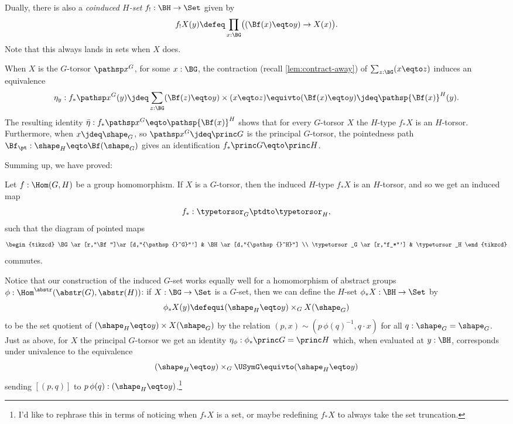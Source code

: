 \begin{remark}
  Dually, there is also a \emph{coinduced $H$-set}
  $f_!:\BH\to\Set$ given by
  \[
    f_!X(y)\defeq\prod_{x:\BG}\bigl((\Bf(x)\eqto y) \to X(x)\bigr).
  \]
  Note that this always lands in sets when $X$ does.
\end{remark}

When $X$ is the $G$-torsor $\pathsp x^G$, for some $x:\BG$,
the contraction (recall \cref{lem:contract-away})
of $\sum_{z:\BG}(x\eqto z)$ induces an equivalence
\[
  \eta_y:f_*\pathsp x^G(y) \jdeq \sum_{z:\BG}(\Bf(z) \eqto y)\times(x \eqto z)
  \equivto (\Bf(x)\eqto y)\jdeq\pathsp{\Bf(x)}^H(y).
\]
The resulting identity $\bar\eta:f_*\pathsp x^G\eqto \pathsp{\Bf(x)}^H$ shows that for every $G$-torsor $X$ the $H$-type $f_*X$ is an $H$-torsor.
Furthermore, when $x\jdeq\shape_G$, so $\pathsp x^G\jdeq\princ G$
is the principal $G$-torsor, the pointedness path $\Bf_\pt : \shape_H\eqto\Bf(\shape_G)$
gives an identification $f_*\princ G\eqto \princ H$.

Summing up, we have proved:
\begin{lemma}
  \label{lem:inducedtorsor}
   Let $f:\Hom(G,H)$ be a group homomorphism.
   If $X$ is a $G$-torsor, then the induced $H$-type $f_*X$ is an $H$-torsor,
   and so we get an induced map
   \[
     f_*:\typetorsor_G\ptdto\typetorsor_H,
   \]
   such that the diagram of pointed maps
   \[
     \begin{tikzcd}
       \BG \ar[r,"\Bf"]\ar[d,"{\pathsp{}^G}"'] &
       \BH\ar[d,"{\pathsp{}^H}"] \\
       \typetorsor_G \ar[r,"f_*"'] & \typetorsor_H
     \end{tikzcd}
   \]
   commutes.
\end{lemma}

\begin{remark}
  \label{rem:inducedGsetfromabstracthomomorphisms}
  Notice that our construction of the induced $G$-set works equally well for
  a homomorphism of abstract groups $\phi:\Hom^\abstr(\abstr(G),\abstr(H))$:
  if $X:\BG\to\Set$ is a $G$-set, then we can
  define the $H$-set $\phi_*X:\BH\to\Set$ by
  \[
    \phi_*X(y)\defequi (\shape_H \eqto y) \times_G X(\shape_G)
  \]
  to be the set quotient of $(\shape_H\eqto y)\times X(\shape_G)$ by
  the relation
  $(p,x)\sim(p\, \phi(q)^{-1},q\cdot x)$ for all $q:\shape_G=\shape_G$.
  Just as above, for $X$ the principal $G$-torsor we get an identity
  $\eta_\phi:\phi_*\princ G=\princ H$ which, when evaluated at $y:\BH$,
  corresponds under univalence to the equivalence
  \[
    (\shape_H\eqto y)\times_G\USymG\equivto (\shape_H\eqto y)
  \]
  sending $[(p,q)]$ to $p\,\phi(q):(\shape_H\eqto y)$.\footnote{%
    \color{red}I'd like to rephrase this in terms of noticing
    when $f_*X$ is a set, or maybe redefining $f_*X$ to always take the
    set truncation.}
\end{remark}

